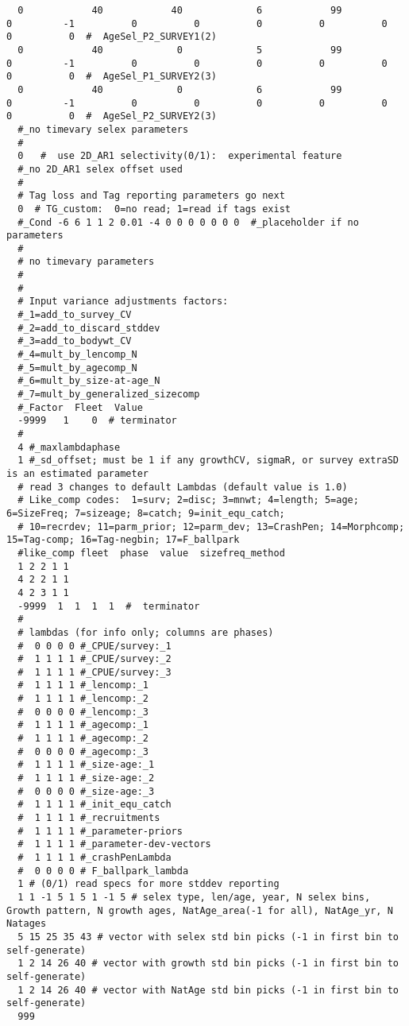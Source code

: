 \begin{landscape}
{\begin{verbatim}
  0            40            40             6            99             0         -1          0          0          0          0          0          0          0  #  AgeSel_P2_SURVEY1(2)
  0            40             0             5            99             0         -1          0          0          0          0          0          0          0  #  AgeSel_P1_SURVEY2(3)
  0            40             0             6            99             0         -1          0          0          0          0          0          0          0  #  AgeSel_P2_SURVEY2(3)
  #_no timevary selex parameters
  #
  0   #  use 2D_AR1 selectivity(0/1):  experimental feature
  #_no 2D_AR1 selex offset used
  #
  # Tag loss and Tag reporting parameters go next
  0  # TG_custom:  0=no read; 1=read if tags exist
  #_Cond -6 6 1 1 2 0.01 -4 0 0 0 0 0 0 0  #_placeholder if no parameters
  #
  # no timevary parameters
  #
  #
  # Input variance adjustments factors: 
  #_1=add_to_survey_CV
  #_2=add_to_discard_stddev
  #_3=add_to_bodywt_CV
  #_4=mult_by_lencomp_N
  #_5=mult_by_agecomp_N
  #_6=mult_by_size-at-age_N
  #_7=mult_by_generalized_sizecomp
  #_Factor  Fleet  Value
  -9999   1    0  # terminator
  #
  4 #_maxlambdaphase
  1 #_sd_offset; must be 1 if any growthCV, sigmaR, or survey extraSD is an estimated parameter
  # read 3 changes to default Lambdas (default value is 1.0)
  # Like_comp codes:  1=surv; 2=disc; 3=mnwt; 4=length; 5=age; 6=SizeFreq; 7=sizeage; 8=catch; 9=init_equ_catch; 
  # 10=recrdev; 11=parm_prior; 12=parm_dev; 13=CrashPen; 14=Morphcomp; 15=Tag-comp; 16=Tag-negbin; 17=F_ballpark
  #like_comp fleet  phase  value  sizefreq_method
  1 2 2 1 1
  4 2 2 1 1
  4 2 3 1 1
  -9999  1  1  1  1  #  terminator
  #
  # lambdas (for info only; columns are phases)
  #  0 0 0 0 #_CPUE/survey:_1
  #  1 1 1 1 #_CPUE/survey:_2
  #  1 1 1 1 #_CPUE/survey:_3
  #  1 1 1 1 #_lencomp:_1
  #  1 1 1 1 #_lencomp:_2
  #  0 0 0 0 #_lencomp:_3
  #  1 1 1 1 #_agecomp:_1
  #  1 1 1 1 #_agecomp:_2
  #  0 0 0 0 #_agecomp:_3
  #  1 1 1 1 #_size-age:_1
  #  1 1 1 1 #_size-age:_2
  #  0 0 0 0 #_size-age:_3
  #  1 1 1 1 #_init_equ_catch
  #  1 1 1 1 #_recruitments
  #  1 1 1 1 #_parameter-priors
  #  1 1 1 1 #_parameter-dev-vectors
  #  1 1 1 1 #_crashPenLambda
  #  0 0 0 0 # F_ballpark_lambda
  1 # (0/1) read specs for more stddev reporting 
  1 1 -1 5 1 5 1 -1 5 # selex type, len/age, year, N selex bins, Growth pattern, N growth ages, NatAge_area(-1 for all), NatAge_yr, N Natages
  5 15 25 35 43 # vector with selex std bin picks (-1 in first bin to self-generate)
  1 2 14 26 40 # vector with growth std bin picks (-1 in first bin to self-generate)
  1 2 14 26 40 # vector with NatAge std bin picks (-1 in first bin to self-generate)
  999
\end{verbatim}
}
\end{landscape}